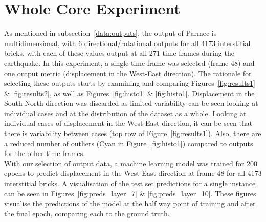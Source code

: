 \section{Whole Core Experiment} \label{prelim:whole}

As mentioned in subsection~\ref{data:outputs}, the output of Parmec is multidimensional, with 6 directional/rotational outputs for all 4173 interstitial bricks, with each of these values output at all 271 time frames during the earthquake. In this experiment, a single time frame was selected (frame 48) and one output metric (displacement in the West-East direction). The rationale for selecting these outputs starts by examining and comparing Figures~\ref{fig:results1} \& \ref{fig:results2}, as well as Figures~\ref{fig:histo1} \& \ref{fig:histo1}. Displacement in the South-North direction was discarded as limited variability can be seen looking at individual cases and at the distribution of the dataset as a whole. Looking at individual cases of displacement in the West-East direction, it can be seen that there is variability between cases (top row of Figure~\ref{fig:results1}). Also, there are a reduced number of outliers (Cyan in Figure~\ref{fig:histo1}) compared to outputs for the other time frames. 
\\

\noindent
With our selection of output data, a machine learning model was trained for 200 epochs to predict displacement in the West-East direction at frame 48 for all 4173 interstitial bricks. A visualisation of the test set predictions for a single instance can be seen in Figures~\ref{fig:preds_layer_7} \& \ref{fig:preds_layer_10}. These figures visualise the predictions of the model at the half way point of training and after the final epoch, comparing each to the ground truth.
\\

